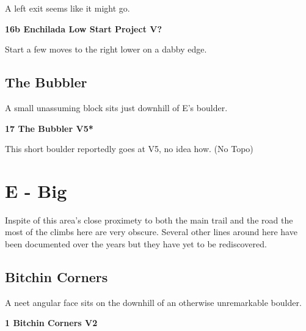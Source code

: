 \begin{multicols}{2}
\begin{adjustwidth}{0.5cm}{}
							\begin{adjustwidth}{0.5cm}{}				
							A left exit seems like it might go.
							\end{adjustwidth}
							\label{vr:Enchilada Low Start Project}
\colorbox{black!20}{
\parbox{0.95\linewidth}{
\textbf{
16b Enchilada Low Start Project V?  
}
}
}

							\begin{adjustwidth}{0.5cm}{}				
							Start a few moves to the right lower on a dabby edge.
							\end{adjustwidth}
						\end{adjustwidth}
			\subsection*{The Bubbler}\label{bf:The Bubbler}
			A small unassuming block sits just downhill of E's boulder.\\
			
					\label{rt:The Bubbler}
\colorbox{RoyalBlue!20}{
\parbox{0.95\linewidth}{
\textbf{
17 The Bubbler V5*  
}
}
}

					\begin{adjustwidth}{0.5cm}{}				
					This short boulder reportedly goes at V5, no idea how.
						\newline (No Topo) 
					\end{adjustwidth}
\newpage

		\section{E - Big}\label{sa:Big}
	Inspite of this area's close proximety to both the main trail and the road the most of the climbs here are very obscure. Several other lines around here have been documented over the years but they have yet to be rediscovered.\\

	
			\subsection*{Bitchin Corners}\label{bf:Bitchin Corners}
			A neet angular face sits on the downhill of an otherwise unremarkable boulder.\\
			

					\label{rt:Bitchin Corners}
\colorbox{green!20}{
\parbox{0.95\linewidth}{
\textbf{
1 Bitchin Corners V2  
}
}
}


\end{multicols}
